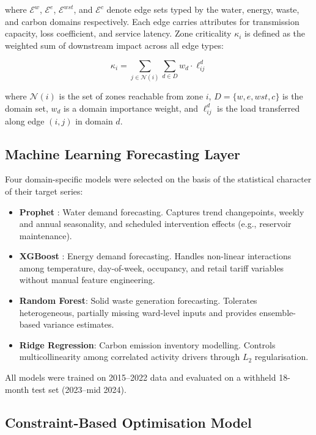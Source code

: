 \documentclass[conference]{IEEEtran}
\begin{document}
where $\mathcal{E}^w$, $\mathcal{E}^e$, $\mathcal{E}^{wst}$, and
$\mathcal{E}^c$ denote edge sets typed by the water, energy, waste, and
carbon domains respectively. Each edge carries attributes for
transmission capacity, loss coefficient, and service latency.
Zone criticality $\kappa_i$ is defined as the weighted sum of downstream
impact across all edge types:

\begin{equation}
\kappa_i = \sum_{j \in \mathcal{N}(i)} \sum_{d \in D} w_d \cdot
\ell_{ij}^d
\label{eq:criticality}
\end{equation}

where $\mathcal{N}(i)$ is the set of zones reachable from zone $i$,
$D = \{w, e, wst, c\}$ is the domain set, $w_d$ is a domain importance
weight, and $\ell_{ij}^d$ is the load transferred along edge
$(i,j)$ in domain $d$.

\subsection{Machine Learning Forecasting Layer}

Four domain-specific models were selected on the basis of the
statistical character of their target series:

\begin{itemize}
\item \textbf{Prophet} \cite{taylor2018}: Water demand forecasting.
Captures trend changepoints, weekly and annual seasonality, and
scheduled intervention effects (e.g., reservoir maintenance).
\item \textbf{XGBoost} \cite{chen2016}: Energy demand forecasting.
Handles non-linear interactions among temperature, day-of-week,
occupancy, and retail tariff variables without manual feature
engineering.
\item \textbf{Random Forest}: Solid waste generation forecasting.
Tolerates heterogeneous, partially missing ward-level inputs and
provides ensemble-based variance estimates.
\item \textbf{Ridge Regression}: Carbon emission inventory modelling.
Controls multicollinearity among correlated activity drivers through
$L_2$ regularisation.
\end{itemize}

All models were trained on 2015--2022 data and evaluated on a withheld
18-month test set (2023--mid 2024).

\subsection{Constraint-Based Optimisation Model}
\end{document}

